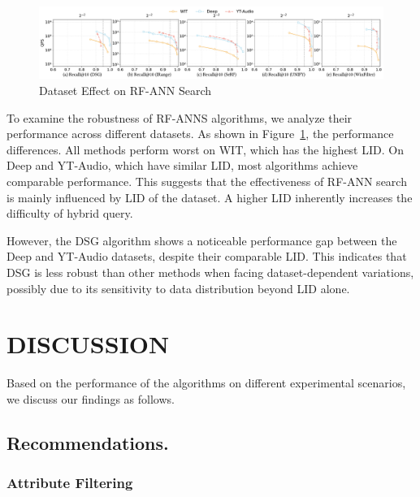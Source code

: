 \documentclass[sigconf, nonacm]{acmart}
\begin{document}
%     
\begin{figure}[htbp]
    \centering
    \setlength{\abovecaptionskip}{0cm}
    \setlength{\belowcaptionskip}{-0.5cm}
    \includegraphics[width=\textwidth]{figures/exp/exp_8_3.pdf}
    \caption{Dataset Effect on RF-ANN Search}
    \label{fig:exp_8_3}
\end{figure}


To examine the robustness of RF-ANNS algorithms, we analyze their performance across different datasets. As shown in Figure~\ref{fig:exp_8_3}, the performance differences. All methods perform worst on WIT, which has the highest LID. On Deep and YT-Audio, which have similar LID, most algorithms achieve comparable performance. 
This suggests that the effectiveness of RF-ANN search is mainly influenced by LID of the dataset. A higher LID inherently increases the difficulty of hybrid query.

However, the DSG algorithm shows a noticeable performance gap between the Deep and YT-Audio datasets, despite their comparable LID. This indicates that DSG is less robust than other methods when facing dataset-dependent variations, possibly due to its sensitivity to data distribution beyond LID alone.

\section{DISCUSSION}
Based on the performance of the algorithms on different experimental scenarios, we discuss our findings as follows.


\subsection{Recommendations.}
\subsubsection{\textbf{Attribute Filtering}}
\end{document}
